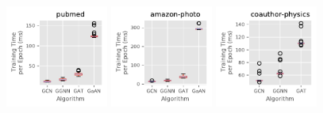 \begin{figure}[H]
    \centering
    \includegraphics[width=0.3\textwidth]{figs/experiments/exp_absolute_training_time_comparison_pubmed.pdf}
    \includegraphics[width=0.3\textwidth]{figs/experiments/exp_absolute_training_time_comparison_amazon-photo.pdf}
    \includegraphics[width=0.3\textwidth]{figs/experiments/exp_absolute_training_time_comparison_coauthor-physics.pdf}


\end{figure}
